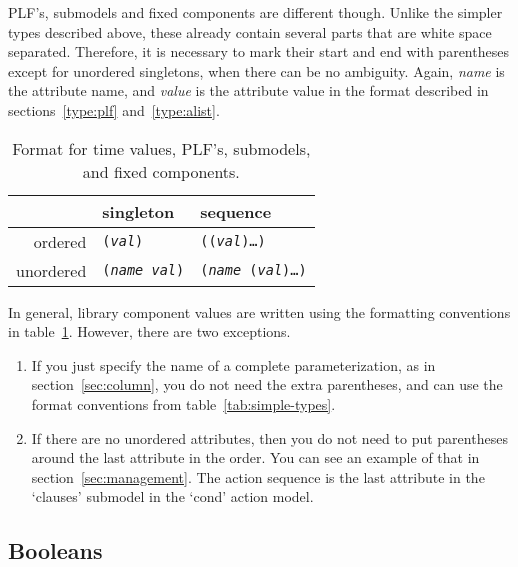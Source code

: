 PLF's, submodels and fixed components are different though.  Unlike
the simpler types described above, these already contain several parts
that are white space separated.  Therefore, it is necessary to mark
their start and end with parentheses except for unordered singletons,
when there can be no ambiguity.  Again, \emph{name} is the attribute
name, and \emph{value} is the attribute value in the format described
in sections~\ref{type:plf} and~\ref{type:alist}.

\begin{table}[htbp]
  \begin{center}
    \begin{tabular}{|r|l|l|} \hline
                & singleton           
                & sequence \\\hline
        ordered & \texttt{(\emph{val})} 
                & \texttt{((\emph{val})\ldots{})} \\\hline
      unordered & \texttt{(\emph{name} \emph{val})}
                & \texttt{(\emph{name} (\emph{val})\ldots{})}\\\hline
  \end{tabular}

  \end{center}
\caption{Format for time values, PLF's, submodels, and fixed
    components.} 
  \label{tab:complex-types}
\end{table}

In general, library component values are written using the formatting
conventions in table~\ref{tab:complex-types}.  However, there are two
exceptions.
\begin{enumerate}
\item If you just specify the name of a complete parameterization, as
  in section~\ref{sec:column}, you do not need the extra parentheses,
  and can use the format conventions from
  table~\ref{tab:simple-types}. 
\item If there are no unordered attributes, then you do not need to
  put parentheses around the last attribute in the order.  You can see
  an example of that in section~\ref{sec:management}.  The action
  sequence is the last attribute in the `clauses' submodel in the
  `cond' action model.
\end{enumerate}

\subsection{Booleans}
\label{type:boolean}

